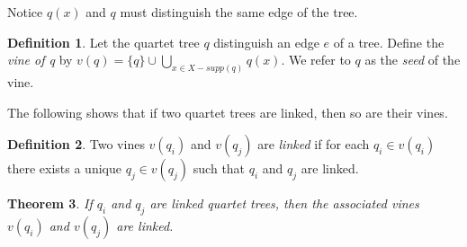 \documentclass[final,3p,times]{elsarticle}
\newtheorem{thm}{Theorem}[section]
\theoremstyle{definition}
\newtheorem{defn}[thm]{Definition}
\theoremstyle{remark}
\begin{document}
Notice $q(x)$ and $q$ must distinguish the same edge of the tree.

\begin{defn}
Let the quartet tree $q$  distinguish an edge $e$ of a tree. Define the \emph{vine of q}  by $v(q)=\{q\} \cup \displaystyle\bigcup_{x\in X-supp(q)}q(x)$.  We refer to $q$ as the \emph{seed} of the vine.
\end{defn}

The following shows that if two quartet trees are linked, then so are their vines.

\begin{defn}
Two vines $v(q_i)$ and $v(q_j)$ are \emph{linked} if for each $q_i \in v(q_i)$ there exists a unique $q_j \in v(q_j)$ such that $q_i$ and $q_j$ are linked. 
\end{defn}

\begin{thm}
If $q_i$ and $q_j$ are linked quartet trees, then  the associated  vines $v(q_i)$ and $v(q_j)$ are linked.
\label{linkedquartets}
\end{thm}
\end{document}
